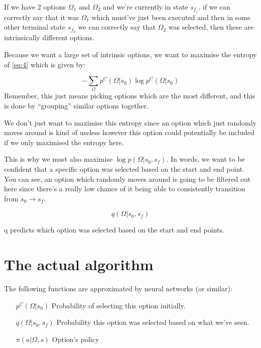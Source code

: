 \documentclass{article}
\begin{document}
  If we have 2 options \(\Omega_{1}\) and \(\Omega_{2}\) and we're currently in state \(s_{f_{1}}\), if we can correctly say that it was \(\Omega_{1}\) which must've just been executed and then in some other terminal state \(s_{f_{2}}\) we can correctly say that \(\Omega_{2}\) was selected, then these are intrinsically different options.



  Because we want a large set of intrinsic options, we want to maximise the entropy of \eqref{eq:4} which is given by:

\begin{equation}
  \label{eq:6}
-\sum_{\Omega} p^{C}(\Omega|s_{0}) \log p^{C}(\Omega | s_{0})
\end{equation}
Remember, this just means picking options which are the most different, and this is done by ``grouping'' similar options together.

We don't just want to maximise this entropy since an option which just randomly moves around is kind of useless however this option could potentially be included if we only maximised the entropy here.


This is why we must also maximise \(\log p(\Omega | s_{0}, s_{f})\). In words, we want to be confident that a specific option was selected based on the start and end point. You can see, an option which randomly moves around is going to be filtered out here since there's a really low chance of it being able to consistently transition from \(s_{0} \to s_{f}\).

\begin{equation}
  \label{eq:7}
  q(\Omega | s_{0}, s_{f})
\end{equation}

q predicts which option was selected based on the start and end points.
\pagebreak
\section{The actual algorithm}

The following functions are approximated by neural networks (or similar):
\begin{enumerate}
  \item[\(p^{C}(\Omega | s_{0})\)] Probability of selecting this option initially.
  \item[\(q(\Omega | s_{0} , s_{f})\)] Probability this option was selected based on what we've seen.
  \item[\( \pi (a | \Omega, s )\)] Option's policy
\end{enumerate}
\end{document}
